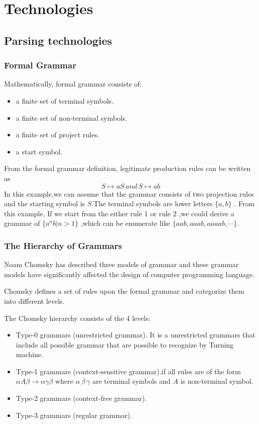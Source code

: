 \chapter{Technologies}
\section{Parsing technologies}
\subsection{Formal Grammar}
Mathematically, formal grammar consists of:
\begin{itemize}
\item a finite set of terminal symbols.
\item a finite set of non-terminal symbols.
\item a finite set of project rules.
\item a start symbol.
\end{itemize} \cite{aho1986compilers} \cite{three_model}
From the formal grammar definition, legitimate production rules can be written as 
 \[ S \mapsto aS  \,and \, S \mapsto ab \]
In this example,we can assume that the grammar consists of two projection rules and the starting symbol is $ S $.The terminal symbols are lower letters $ \{a ,b\} $ . From this example, If we start from the either rule 1 or rule 2 ,we could derive a  grammar of $ \{ a^n b | n>1  \}$ ,which can be enumerate like $ \{aab,aaab,aaaab,\cdots \} $.






\subsection{The Hierarchy of Grammars}
Noam Chomsky has described three models of grammar \cite{three_model} and these grammar models have significantly affected the design of computer programming language.

Chomsky defines a set of rules upon the formal grammar and categorize them into different levels.

The Chomsky hierarchy consists of the 4 levels:
\begin{itemize}
\item Type-0 grammars (unrestricted grammar). It is a unrestricted grammars that include all possible grammar that are possible to recognize by Turning machine.
\item Type-1 grammars (context-sensitive grammar).if all rules are of the form $  \alpha A \beta \rightarrow \alpha \gamma \beta$ where $ \alpha \,  \beta \, \gamma $ are terminal symbols and $ A $ is non-terminal symbol.
\item Type-2 grammars (context-free grammar). 
\item Type-3 grammars (regular grammar).
\end{itemize}


